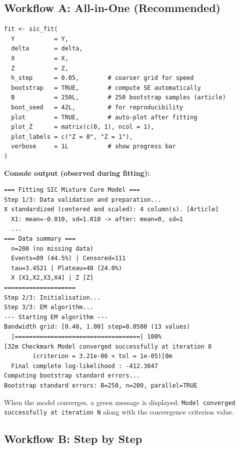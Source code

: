 \documentclass[12pt,a4paper]{article}
\begin{document}
\subsection{Workflow A: All-in-One (Recommended)}

\begin{lstlisting}[style=Rcode,
  caption={Fitting with integrated bootstrap and plots}]
fit <- sic_fit(
  Y           = Y,
  delta       = delta,
  X           = X,
  Z           = Z,
  h_step      = 0.05,        # coarser grid for speed
  bootstrap   = TRUE,        # compute SE automatically
  B           = 250L,        # 250 bootstrap samples (article)
  boot_seed   = 42L,         # for reproducibility
  plot        = TRUE,        # auto-plot after fitting
  plot_Z      = matrix(c(0, 1), ncol = 1),
  plot_labels = c("Z = 0", "Z = 1"),
  verbose     = 1L           # show progress bar
)
\end{lstlisting}

\textbf{Console output (observed during fitting):}

\begin{lstlisting}[style=Routput]
=== Fitting SIC Mixture Cure Model ===
Step 1/3: Data validation and preparation...
X standardized (centered and scaled): 4 column(s). [Article]
  X1: mean=-0.010, sd=1.010 -> after: mean=0, sd=1
  ...
=== Data summary ===
  n=200 (no missing data)
  Events=89 (44.5%) | Censored=111
  tau=3.4521 | Plateau=48 (24.0%)
  X [X1,X2,X3,X4] | Z [Z]
====================
Step 2/3: Initialisation...
Step 3/3: EM algorithm...
--- Starting EM algorithm ---
Bandwidth grid: [0.40, 1.00] step=0.0500 (13 values)
  |===================================| 100%
[32m Checkmark Model converged successfully at iteration 8
        (criterion = 3.21e-06 < tol = 1e-05)[0m
  Final complete log-likelihood : -412.3847
Computing bootstrap standard errors...
Bootstrap standard errors: B=250, n=200, parallel=TRUE
\end{lstlisting}

\begin{infobox}
When the model converges, a green message is displayed:
\textcolor{vert}{\texttt{\checkmark Model converged successfully at iteration N}}
along with the convergence criterion value.
\end{infobox}

\subsection{Workflow B: Step by Step}
\end{document}
